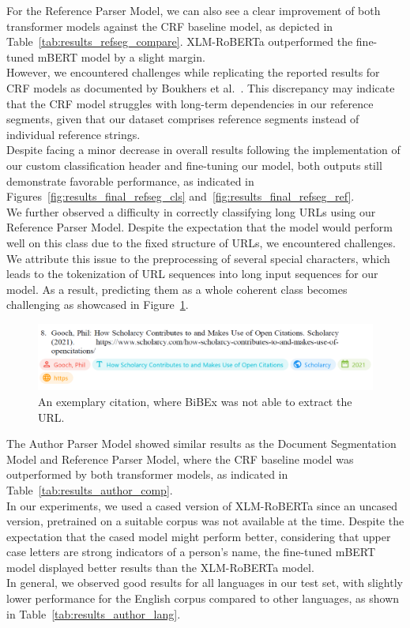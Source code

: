 For the Reference Parser Model, we can also see a clear improvement of both transformer models against the CRF baseline model, as depicted in Table~\ref{tab:results_refseg_compare}. XLM-RoBERTa outperformed the fine-tuned mBERT model by a slight margin.\\
However, we encountered challenges while replicating the reported results for CRF models as documented by Boukhers et al.~\cite{excite_methods}. This discrepancy may indicate that the CRF model struggles with long-term dependencies in our reference segments, given that our dataset comprises reference segments instead of individual reference strings.\\
Despite facing a minor decrease in overall results following the implementation of our custom classification header and fine-tuning our model, both outputs still demonstrate favorable performance, as indicated in Figures~\ref{fig:results_final_refseg_cls} and~\ref{fig:results_final_refseg_ref}.\\
We further observed a difficulty in correctly classifying long URLs using our Reference Parser Model. Despite the expectation that the model would perform well on this class due to the fixed structure of URLs, we encountered challenges. We attribute this issue to the preprocessing of several special characters, which leads to the tokenization of URL sequences into long input sequences for our model. As a result, predicting them as a whole coherent class becomes challenging as showcased in Figure~\ref{fig:url_error}.

\begin{figure}[!t]
    \centering
    \includegraphics[width=1.0\linewidth]{images/url.png}
    \caption{An exemplary citation, where BiBEx was not able to extract the URL.}
    \label{fig:url_error}
\end{figure}

The Author Parser Model showed similar results as the Document Segmentation Model and Reference Parser Model, where the CRF baseline model was outperformed by both transformer models, as indicated in Table~\ref{tab:results_author_comp}.\\
In our experiments, we used a cased version of XLM-RoBERTa since an uncased version, pretrained on a suitable corpus was not available at the time. Despite the expectation that the cased model might perform better, considering that upper case letters are strong indicators of a person's name, the fine-tuned mBERT model displayed better results than the XLM-RoBERTa model.\\
In general, we observed good results for all languages in our test set, with slightly lower performance for the English corpus compared to other languages, as shown in Table~\ref{tab:results_author_lang}.

